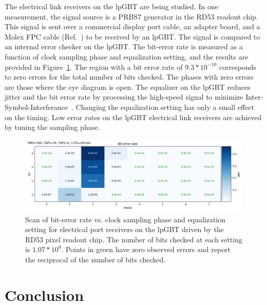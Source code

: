 \documentclass[a4paper,11pt]{article}
\newcommand{\fig}{Figure}
\begin{document}
The electrical link receivers on the lpGBT are being studied.
In one measurement, the signal source is a PRBS7 generator in the RD53 readout chip.
This signal is sent over a commercial display port cable, an adapter board, and a Molex FPC cable (Ref.~\cite{ref:molex_cable}) to be received by an lpGBT.
The signal is compared to an internal error checker on the lpGBT.
The bit-error rate is measured as a function of clock sampling phase and equalization setting, and the results are provided in \fig~\ref{fig:lpgbt_bert}.
The region with a bit error rate of $9.3 * 10^{-10}$ corresponds to zero errors for the total number of bits checked.
The phases with zero errors are those where the eye diagram is open.
The equalizer on the lpGBT reduces jitter and the bit error rate by processing the high-speed signal to minimize Inter-Symbol-Interferance~\cite{ref:lpgbt_2}.
Changing the equalization setting has only a small effect on the timing.
Low error rates on the lpGBT electrical link receivers are achieved by tuning the sampling phase.


\begin{figure}[htbp]
\centering
\includegraphics[width=1.0\textwidth,origin=c]{../figures/lpGBT_bert.png}
\caption{
\label{fig:lpgbt_bert}
Scan of bit-error rate vs. clock sampling phase and equalization setting for electrical port receivers on the lpGBT driven by the RD53 pixel readout chip.
The number of bits checked at each setting is $1.07 * 10^{9}$.
Points in green have zero observed errors and report the reciprocal of the number of bits checked.
}
\end{figure}

\section{Conclusion}
\label{sec:conclusion}
\end{document}

